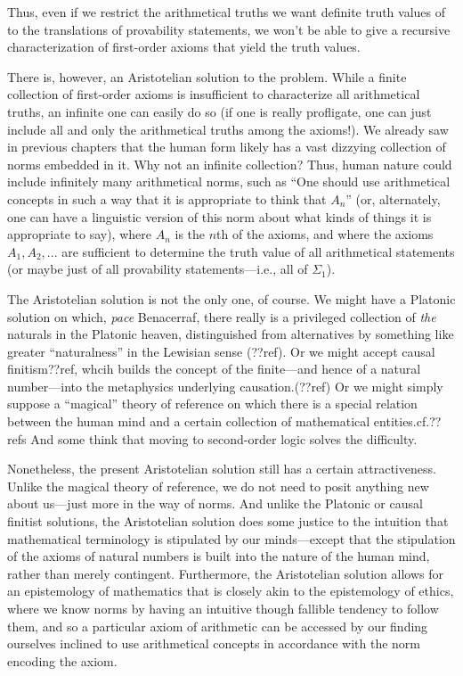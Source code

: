 Thus, even if we restrict the arithmetical truths we want definite truth values of to the translations of provability
statements, we won't be able to give a recursive characterization of first-order axioms that yield the truth values.

There is, however, an Aristotelian solution to the problem. While a finite collection of first-order axioms is insufficient 
to characterize all arithmetical truths, an infinite one can easily do so (if one is really profligate, one can just include all and only the arithmetical truths among the axioms!). We already saw in previous chapters that the human form likely has a vast
dizzying collection of norms embedded in it. Why not an infinite collection? Thus, human nature could include infinitely many arithmetical norms, such as ``One should use arithmetical concepts in such a way that it is appropriate to think that $A_n$'' (or, alternately, one can have a linguistic version of this norm about what kinds of things it is appropriate to say), where $A_n$ is the $n$th of the axioms, and where the axioms $A_1,A_2,...$ are sufficient to determine the truth value of all arithmetical statements (or maybe just of all 
provability statements---i.e., all of $\Sigma_1$).

The Aristotelian solution is not the only one, of course. We might have a Platonic solution on which, \textit{pace} Benacerraf,
there really is a privileged collection of \textit{the} naturals in the Platonic heaven, distinguished from alternatives by 
something like greater ``naturalness'' in the Lewisian sense (??ref). Or we might accept causal finitism??ref,
whcih builds the concept of the finite---and hence of a natural number---into the metaphysics underlying causation.(??ref) 
Or we might simply suppose a ``magical'' theory of reference on which there is a special relation between the human 
mind and a certain collection of mathematical entities.cf.??refs And some think that moving to second-order logic solves the
difficulty.

Nonetheless, the present Aristotelian solution still has a certain attractiveness. Unlike the magical theory of reference, we do not need 
to posit anything new about us---just more in the way of norms. And unlike the Platonic or causal finitist solutions, the
Aristotelian solution does some justice to the intuition that mathematical terminology is stipulated by our minds---except 
that the stipulation of the axioms of natural numbers is built into the nature of the human mind, rather than merely contingent.
Furthermore, the Aristotelian solution allows for an epistemology of mathematics that is closely akin to the epistemology 
of ethics, where we know norms by having an intuitive though fallible tendency to follow them, and so a particular axiom of 
arithmetic can be accessed by our finding ourselves inclined to use arithmetical concepts in accordance with the norm encoding
the axiom.

